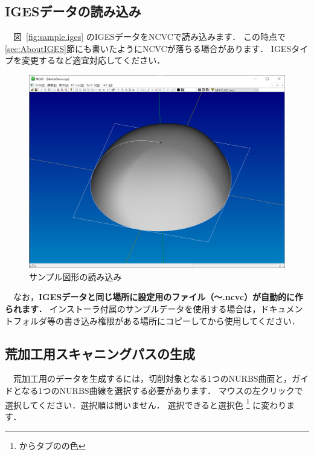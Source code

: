 
\subsection{IGESデータの読み込み}
　図~\ref{fig:sample.iges} のIGESデータをNCVCで読み込みます．
この時点で \ref{sec:AboutIGES}節にも書いたようにNCVCが落ちる場合があります．
IGESタイプを変更するなど適宜対応してください．

\begin{figure}[H]
\centering
\includegraphics[scale=0.5]{No2/fig/fig21.png}
\caption{サンプル図形の読み込み}
\label{fig:ncvc21}
\end{figure}

　なお，\textbf{IGESデータと同じ場所に設定用のファイル（～.ncvc）が自動的に作られます．}
インストーラ付属のサンプルデータを使用する場合は，ドキュメントフォルダ等の書き込み権限がある場所にコピーしてから使用してください．

\subsection{荒加工用スキャニングパスの生成}
　荒加工用のデータを生成するには，切削対象となる1つのNURBS曲面と，ガイドとなる1つのNURBS曲線を選択する必要があります．
マウスの左クリックで選択してください．選択順は問いません．
選択できると選択色
\footnote{からタブのの色}
に変わります．

